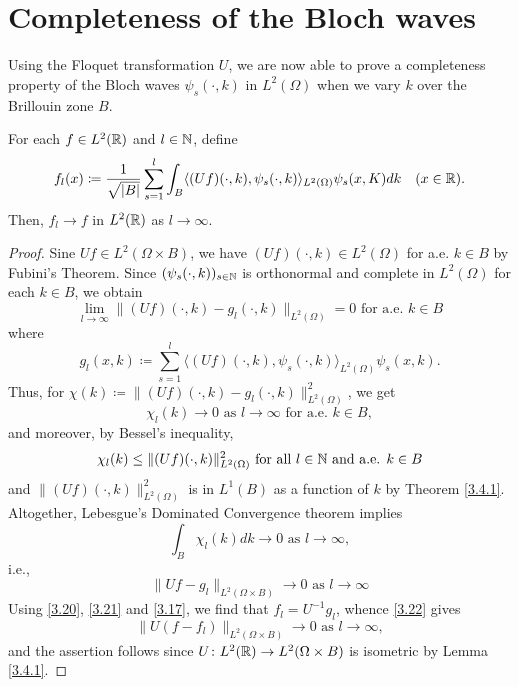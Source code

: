 \chapter{Completeness of the Bloch waves}

Using the Floquet transformation $U$, we are now able to prove a completeness property of the Bloch waves $\psi_{s}(\cdot, k)$ in $L^{2}(\Omega)$ when we vary $k$ over the Brillouin zone $B$.
	
\begin{theorem}
		For each $f \in L^{2}(\mathbb{R})$ and $l \in \mathbb{N}$, define
			\begin{equation}
				f_{l}(x) \coloneqq \frac{1}{\sqrt{|B|}} \sum_{s=1}^{l} \int_{B} \langle (Uf)(\cdot, k), \psi_{s}(\cdot, k) \rangle_{L^{2}(\Omega)} \psi_{s}(x, K) dk \quad (x \in \mathbb{R}). \label{3.20}
			\end{equation}
		Then, $f_{l} \rightarrow f$ in $L^{2}(\mathbb{R})$ as $l \rightarrow \infty$.

	\begin{proof}
		Sine $Uf \in L^{2}(\Omega \times B)$, we have $(Uf)(\cdot, k) \in L^{2}(\Omega)$ for a.e. $k \in B$ by Fubini's Theorem. Since $(\psi_{s}(\cdot, k))_{s \in \mathbb{N}}$ is orthonormal and complete in $L^{2}(\Omega)$ for each $k \in B$, we obtain
			\[ \lim_{l \rightarrow \infty} \| (Uf)(\cdot, k) - g_{l}(\cdot, k) \|_{L^{2}(\Omega)} = 0 \text{ for a.e. } k \in B\]
		where 
			\begin{equation}
				g_{l}(x, k) \coloneqq \sum_{s=1}^{l} \langle(Uf)(\cdot, k), \psi_{s}(\cdot,k)\rangle_{L^{2}(\Omega)} \psi_{s}(x,k). \label{3.21}
			\end{equation}
		Thus, for $\chi(k) \coloneqq \| (Uf)(\cdot, k) - g_{l}(\cdot, k) \|^{2}_{L^{2}(\Omega)}$, we get
			\[ \chi_{l}(k) \rightarrow 0 \text{ as } l \rightarrow \infty \text{ for a.e. } k \in B, \]
		and moreover, by Bessel's inequality,
			\[ \chi_{l}(k) \leq \| (Uf)(\cdot, k) \|^{2}_{L^{2}(\Omega)} \text{ for all } l \in \mathbb{N} \text{ and a.e. } k \in B \]
		and $\|(Uf)(\cdot, k)\|^{2}_{L^{2}(\Omega)}$ is in $L^{1}(B)$ as a function of $k$ by Theorem \ref{3.4.1}. Altogether, Lebesgue's Dominated Convergence theorem implies
			\[ \int_{B} \chi_{l}(k) dk \rightarrow 0 \text{ as } l \rightarrow \infty, \]
		i.e., 
			\begin{equation}
				\| U f - g_{l} \|_{L^{2}(\Omega \times B)} \rightarrow 0 \text{ as } l \rightarrow \infty \label{3.22}
			\end{equation} 
		Using \eqref{3.20}, \eqref{3.21} and \eqref{3.17}, we find that $f_{l} = U^{-1}g_{l}$, whence \eqref{3.22} gives
			\[ \| U(f - f_{l}) \|_{L^{2}(\Omega \times B)} \rightarrow 0 \text{ as } l \rightarrow \infty,\]
		and the assertion follows since $U \colon L^{2}(\mathbb{R}) \rightarrow L^{2}(\Omega \times B)$ is isometric by Lemma \eqref{3.4.1}.
	\end{proof}
\end{theorem}